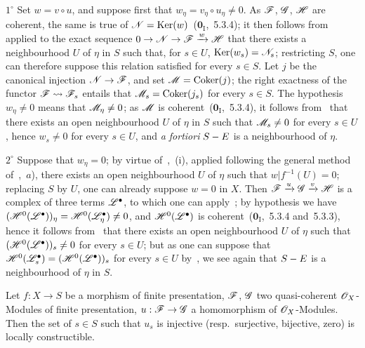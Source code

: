$1^\circ$ Set $w=v\circ u$, and suppose first that $w_\eta=v_\eta\circ u_\eta\neq 0$.
As $\mathscr{F}$, $\mathscr{G}$, $\mathscr{H}$ are coherent, the same is true of $\mathscr{N}=\operatorname{Ker}(w)$~($\mathbf{0}_{\mathrm{I}}$,~5.3.4); it then follows from~ applied to the exact sequence $0\to\mathscr{N}\to\mathscr{F}\xrightarrow{w}\mathscr{H}$ that there exists a neighbourhood $U$ of $\eta$ in $S$ such that, for $s\in U$, $\operatorname{Ker}(w_s)=\mathscr{N}_s$; restricting $S$, one can therefore suppose this relation satisfied for every $s\in S$.
Let $j$ be the canonical injection $\mathscr{N}\to\mathscr{F}$, and set $\mathscr{M}=\operatorname{Coker}(j)$; the right exactness of the functor $\mathscr{F}\leadsto\mathscr{F}_s$ entails that $\mathscr{M}_s=\operatorname{Coker}(j_s)$ for every $s\in S$.
The hypothesis $w_\eta\neq 0$ means that $\mathscr{M}_\eta\neq 0$; as $\mathscr{M}$ is coherent~($\mathbf{0}_{\mathrm{I}}$,~5.3.4), it follows from~ that there exists an open neighbourhood $U$ of $\eta$ in $S$ such that $\mathscr{M}_s\neq 0$ for every $s\in U$, hence $w_s\neq 0$ for every $s\in U$, and \emph{a fortiori} $S- E$ is a neighbourhood of $\eta$.

$2^\circ$ Suppose that $w_\eta=0$; by virtue of~,~(i), applied following the general method of~,~$a$), there exists an open neighbourhood $U$ of $\eta$ such that $w|f^{-1}(U)=0$; replacing $S$ by $U$, one can already suppose $w=0$ in $X$.
Then $\mathscr{F}\xrightarrow{u}\mathscr{G}\xrightarrow{v}\mathscr{H}$ is a complex of three terms $\mathscr{L}^\bullet$, to which one can apply~; by hypothesis we have $(\mathscr{H}^0(\mathscr{L}^\bullet))_\eta=\mathscr{H}^0(\mathscr{L}^\bullet_\eta)\neq 0$, and $\mathscr{H}^0(\mathscr{L}^\bullet)$ is coherent~($\mathbf{0}_{\mathrm{I}}$,~5.3.4 and~5.3.3), hence it follows from~ that there exists an open neighbourhood $U$ of $\eta$ such that $(\mathscr{H}^0(\mathscr{L}^\bullet))_s\neq 0$ for every $s\in U$; but as one can suppose that $\mathscr{H}^0(\mathscr{L}^\bullet_s)=(\mathscr{H}^0(\mathscr{L}^\bullet))_s$ for every $s\in U$ by~, we see again that $S- E$ is a neighbourhood of $\eta$ in $S$.


\begin{corollary}[9.4.5]
\label{IV.9.4.5}
Let $f:X\to S$ be a morphism of finite presentation, $\mathscr{F}$, $\mathscr{G}$ two quasi-coherent $\mathscr{O}_X$-Modules of finite presentation, $u:\mathscr{F}\to\mathscr{G}$ a homomorphism of $\mathscr{O}_X$-Modules.
Then the set of $s\in S$ such that $u_s$ is injective \textnormal{(resp.}\ surjective, bijective, zero\textnormal{)} is locally constructible.
\end{corollary}

